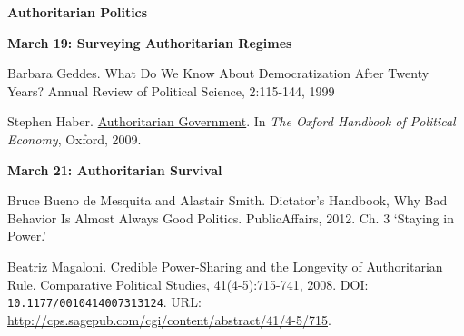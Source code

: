 \documentclass[letterpaper]{article}
\renewenvironment{itemize}{
  \begin{list}{}{
    \setlength{\leftmargin}{1.5em}
  }
}{
  \end{list}
}
\begin{document}
\begin{enumerate}



\item {\bf Authoritarian Politics}
\begin{itemize}	
	\item {\bf March 19: Surveying Authoritarian Regimes}
			\begin{itemize}
				\item[$\bullet$] Barbara Geddes. What Do We Know About Democratization After Twenty Years? Annual Review of Political Science, 2:115-144, 1999
				\item[$\bullet$] Stephen Haber. \href{http://www.oxfordhandbooks.com/oxford/downloaddoclightbox/$002f10.1093$002foxfordhb$002f9780199548477.001.0001$002foxfordhb-9780199548477-e-038/Authoritarian$0020Government;jsessionid=2E89E3A5EE542CF1CE7583F64EFD4C17?nojs=true}{Authoritarian Government}. In \emph{The Oxford Handbook of Political Economy}, Oxford, 2009. 
			\end{itemize}


	\item {\bf March 21: Authoritarian Survival}
			\begin{itemize}
				\item[$\bullet$] Bruce Bueno de Mesquita and Alastair Smith. Dictator's Handbook, Why Bad Behavior Is Almost Always Good Politics. PublicAffairs, 2012. Ch. 3 `Staying in Power.'
				\item[$\bullet$] Beatriz Magaloni. Credible Power-Sharing and the Longevity of Authoritarian Rule. Comparative Political Studies, 41(4-5):715-741, 2008. DOI: \texttt{10.1177/0010414007313124}. URL: \url{http://cps.sagepub.com/cgi/content/abstract/41/4-5/715}.
			\end{itemize}
\end{itemize}




\end{enumerate}
\end{document}
